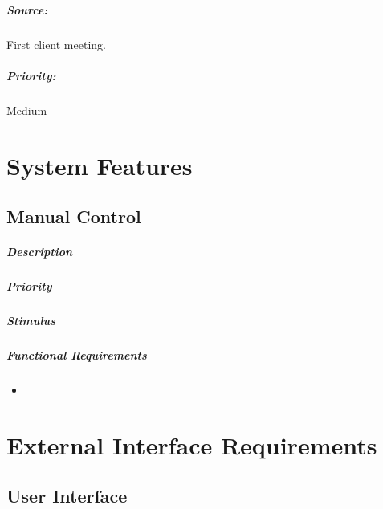 \documentclass[11pt, a4paper]{report}
\begin{document}
\paragraph{Source:}
First client meeting.
\paragraph{Priority:}
Medium

        
           

\pagebreak
\chapter{System Features}


\section{Manual Control}
\paragraph{Description}
\paragraph{Priority}
\paragraph{Stimulus}
\paragraph{Functional Requirements}
\begin{itemize}
\item 
\end{itemize}


\pagebreak
 


\chapter{External Interface Requirements}

\section{User Interface}
\end{document}
